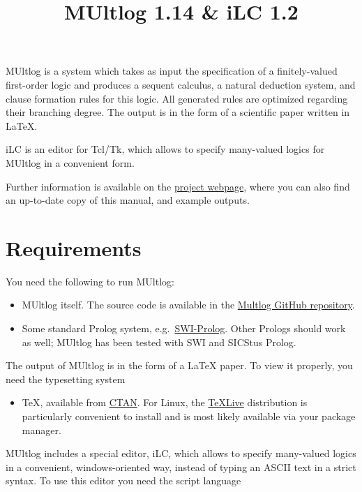 \documentclass[]{article}
\title{MUltlog 1.14 \& iLC 1.2}
\date{}
\providecommand{\tightlist}{%
  \setlength{\itemsep}{0pt}\setlength{\parskip}{0pt}}
\begin{document}
\maketitle

{
\setcounter{tocdepth}{3}
\tableofcontents
}
MUltlog is a system which takes as input the specification of a
finitely-valued first-order logic and produces a sequent calculus, a
natural deduction system, and clause formation rules for this logic. All
generated rules are optimized regarding their branching degree. The
output is in the form of a scientific paper written in LaTeX.

iLC is an editor for Tcl/Tk, which allows to specify many-valued logics
for MUltlog in a convenient form.

Further information is available on the
\href{http://www.logic.at/multlog/}{project webpage}, where you can also
find an up-to-date copy of this manual, and example outputs.

\hypertarget{requirements}{%
\section{Requirements}\label{requirements}}

You need the following to run MUltlog:

\begin{itemize}
\item
  MUltlog itself. The source code is available in the
  \href{https://github.com/rzach/multlog}{Multlog GitHub repository}.
\item
  Some standard Prolog system,
  e.g.~\href{https://www.swi-prolog.org/}{SWI-Prolog}. Other Prologs
  should work as well; MUltlog has been tested with SWI and SICStus
  Prolog.
\end{itemize}

The output of MUltlog is in the form of a LaTeX paper. To view it
properly, you need the typesetting system

\begin{itemize}
\tightlist
\item
  TeX, available from \href{https://ctan.org/}{CTAN}. For Linux, the
  \href{https://www.tug.org/texlive/}{TeXLive} distribution is
  particularly convenient to install and is most likely available via
  your package manager.
\end{itemize}

MUltlog includes a special editor, iLC, which allows to specify
many-valued logics in a convenient, windows-oriented way, instead of
typing an ASCII text in a strict syntax. To use this editor you need the
script language
\end{document}
